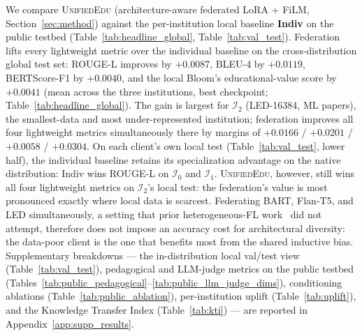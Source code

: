 \documentclass[11pt]{article}
\theoremstyle{plain}
\theoremstyle{definition}
\theoremstyle{remark}
\newcommand{\UniEdu}{\textsc{UnifiedEdu}}
\begin{document}
We compare \UniEdu{} (architecture-aware federated
LoRA + FiLM, Section~\ref{sec:method}) against the
per-institution local baseline \textbf{Indiv} on the
public testbed (Table~\ref{tab:headline_global},
Table~\ref{tab:val_test}). Federation lifts every
lightweight metric over the individual baseline on
the cross-distribution global test set: ROUGE-L
improves by $+0.0087$, BLEU-4 by $+0.0119$,
BERTScore-F1 by $+0.0040$, and the local Bloom's
educational-value score by $+0.0041$ (mean across
the three institutions, best checkpoint;
Table~\ref{tab:headline_global}). The gain is
largest for $\mathcal{I}_2$ (LED-16384, ML papers),
the smallest-data and most under-represented
institution; federation improves all four
lightweight metrics simultaneously there by margins of
$+0.0166$ / $+0.0201$ / $+0.0058$ / $+0.0304$. On
each client's own local test
(Table~\ref{tab:val_test}, lower half), the
individual baseline retains its specialization
advantage on the native distribution: Indiv wins
ROUGE-L on $\mathcal{I}_0$ and $\mathcal{I}_1$.
\UniEdu{}, however, still wins all four lightweight
metrics on $\mathcal{I}_2$'s local test: the
federation's value is most pronounced exactly where
local data is scarcest. Federating BART, Flan-T5,
and LED simultaneously, a setting that prior
heterogeneous-FL work~\citep{wu2022fedkd,
li2019fedmd, lin2020feddf, cheng2022fedet} did not
attempt, therefore does not impose an accuracy cost
for architectural diversity: the data-poor client
is the one that benefits most from the shared
inductive bias. Supplementary breakdowns --- the in-distribution
local val/test view (Table~\ref{tab:val_test}),
pedagogical and LLM-judge metrics on the public
testbed (Tables~\ref{tab:public_pedagogical}--\ref{tab:public_llm_judge_dims}),
conditioning ablations (Table~\ref{tab:public_ablation}),
per-institution uplift (Table~\ref{tab:uplift}), and
the Knowledge Transfer Index
(Table~\ref{tab:kti}) --- are reported in
Appendix~\ref{app:supp_results}.
\end{document}
